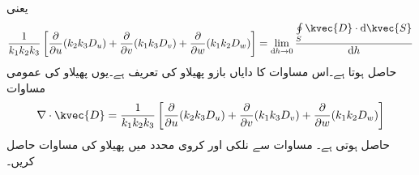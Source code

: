 یعنی
\begin{align*}
\frac{1}{k_1 k_2 k_3}\left[\frac{\partial }{\partial u} ( k_2 k_3  D_{u})+\frac{\partial }{\partial v} ( k_1 k_3  D_{v})+\frac{\partial }{\partial w} ( k_1 k_2  D_{w}) \right] =\lim_{\dif h \to 0}\frac{\oint\limits_{S} \kvec{D} \cdot \dif \kvec{S}}{\dif h}
\end{align*}
حاصل ہوتا ہے۔اس مساوات کا دایاں بازو پھیلاو کی تعریف ہے۔یوں پھیلاو کی عمومی مساوات
\begin{align}\label{مساوات_گاؤس_پھیلاو_کی_عمومی_مساوات}
\nabla \cdot \kvec{D}=\frac{1}{k_1 k_2 k_3}\left[\frac{\partial }{\partial u} ( k_2 k_3  D_{u})+\frac{\partial }{\partial v} ( k_1 k_3  D_{v})+\frac{\partial }{\partial w} ( k_1 k_2  D_{w}) \right] 
\end{align}
حاصل ہوتی ہے۔
مساوات  سے  نلکی اور کروی محدد میں پھیلاو کی مساوات حاصل کریں۔

